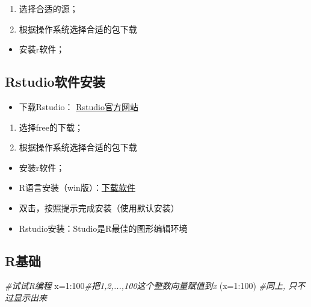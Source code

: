\documentclass[
]{book}
\newenvironment{Shaded}{\begin{snugshade}}{\end{snugshade}}
\newcommand{\AttributeTok}[1]{\textcolor[rgb]{0.77,0.63,0.00}{#1}}
\newcommand{\CommentTok}[1]{\textcolor[rgb]{0.56,0.35,0.01}{\textit{#1}}}
\newcommand{\DecValTok}[1]{\textcolor[rgb]{0.00,0.00,0.81}{#1}}
\newcommand{\NormalTok}[1]{#1}
\newcommand{\OtherTok}[1]{\textcolor[rgb]{0.56,0.35,0.01}{#1}}
\newcommand{\SpecialCharTok}[1]{\textcolor[rgb]{0.00,0.00,0.00}{#1}}
\providecommand{\tightlist}{%
  \setlength{\itemsep}{0pt}\setlength{\parskip}{0pt}}
\begin{document}
\begin{enumerate}
\def\labelenumi{\arabic{enumi}.}
\tightlist
\item
  选择合适的源；
\item
  根据操作系统选择合适的包下载
\end{enumerate}

\begin{itemize}
\tightlist
\item
  安装r软件；
\end{itemize}

\hypertarget{rstudioux8f6fux4ef6ux5b89ux88c5}{%
\subsection{Rstudio软件安装}\label{rstudioux8f6fux4ef6ux5b89ux88c5}}

\begin{itemize}
\tightlist
\item
  下载Rstudio：
  \href{https://www.rstudio.com/products/rstudio/download/}{Rstudio官方网站}
\end{itemize}

\begin{enumerate}
\def\labelenumi{\arabic{enumi}.}
\tightlist
\item
  选择free的下载；
\item
  根据操作系统选择合适的包下载
\end{enumerate}

\begin{itemize}
\item
  安装r软件；
\item
  R语言安装（win版）：\href{https://cran.r-project.org/bin/windows/base/R-3.6.1-win.exe}{下载软件}
\item
  双击，按照提示完成安装（使用默认安装）
\item
  Rstudio安装：Studio是R最佳的图形编辑环境
\end{itemize}

\hypertarget{rux57faux7840}{%
\subsection{R基础}\label{rux57faux7840}}

\begin{Shaded}
\begin{Highlighting}[]
\CommentTok{\#试试R编程 }
\NormalTok{x}\OtherTok{=}\DecValTok{1}\SpecialCharTok{:}\DecValTok{100}\CommentTok{\#把1,2,...,100这个整数向量赋值到x}
\NormalTok{(}\AttributeTok{x=}\DecValTok{1}\SpecialCharTok{:}\DecValTok{100}\NormalTok{) }\CommentTok{\#同上, 只不过显示出来}
\end{Highlighting}
\end{Shaded}
\end{document}
